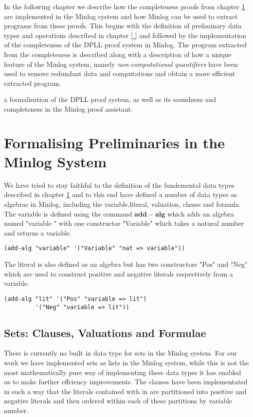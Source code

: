 In the following chapter we describe how the completeness proofs from chapter \ref{} are implemented in the Minlog system and how Minlog can be used to extract programs from these proofs.  This begins with the definition of preliminary data types and operations described in chapter \ref{ } and followed by the implementation of the completeness of the DPLL proof system in Minlog. The program extracted from the completeness is described along with a description of how a unique feature of the Minlog system, namely \emph{non-computational quantifiers} have been used to remove redundant data and computations and obtain a more efficient extracted program.


a formalisation of the DPLL proof system, as well as its soundness and completeness in the Minlog proof assistant.

\section{Formalising Preliminaries in the Minlog System}
We have tried to stay faithful to the definition of the fundemental data types described in chapter \ref{} and to this end have defined a number of data types as algebras in Minlog, including the variable,literal, valuation, clause and formula. The variable is defined using the command $\mathbf{add-alg}$ which adds an algebra named "variable " with one constructor "Variable" which takes a natural number and returns a variable.
\begin{lstlisting}[caption = "Definition of a variable in Minlog"]
(add-alg "variable" '("Variable" "nat => variable"))
\end{lstlisting}
The literal is also defined as an algebra but has two constructors "Pos" and "Neg" which are used to construct positive and negative literals respectively from a variable.
\begin{lstlisting}[caption = "Definition of a literal in Minlog"]
(add-alg "lit" '("Pos" "variable => lit")
         '("Neg" "variable => lit"))
\end{lstlisting}

\subsection*{Sets: Clauses, Valuations and Formulae}
There is currently no built in data type for sets in the Minlog system. For our work we have implemented sets as lists in the Minlog system, while this is not the most mathematically pure way of implementing these data types it has enabled us to make further effciency improvements. The clauses have been implementated in such a way that the literals contained with in are partitioned into positive and negative literals and then ordered within each of these partitions by variable number.







